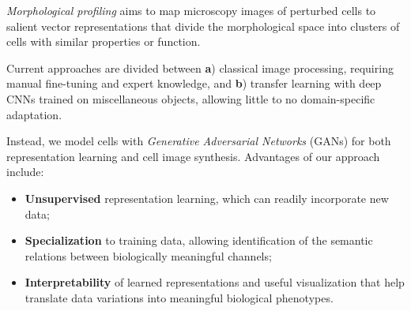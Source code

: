 \documentclass[a0paper,portrait]{baposter}
\newcommand{\compresslist}{
\setlength{\itemsep}{1pt}
\setlength{\parskip}{2pt}
\setlength{\parsep}{2pt}
\vspace{-0.75em}
}
\begin{document}
\begin{poster}
{\emph{Morphological profiling} aims to map microscopy images of perturbed cells to salient vector representations that divide the morphological space into clusters of cells with similar properties or function.

\vspace{2mm}

Current approaches are divided between \textbf{a}) classical image processing, requiring manual fine-tuning and expert knowledge, and \textbf{b}) transfer learning with deep CNNs trained on miscellaneous objects, allowing little to no domain-specific adaptation.

\vspace{2mm}

Instead, we model cells with \emph{Generative Adversarial Networks} (GANs) for both representation learning and cell image synthesis. Advantages of our approach include:
\vspace{2mm}
\begin{itemize}
\compresslist
\item \textbf{Unsupervised} representation learning, which can readily incorporate new data;
\item \textbf{Specialization} to training data, allowing identification of the semantic relations between biologically meaningful channels;
\item \textbf{Interpretability} of learned representations and useful visualization that help translate data variations into meaningful biological phenotypes.
\end{itemize}
}

\end{poster}
\end{document}
